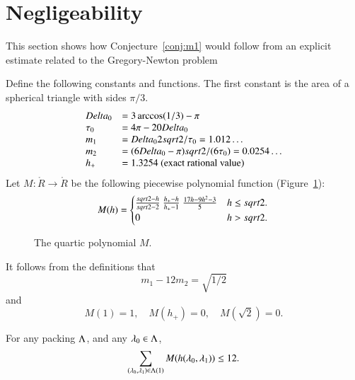 \section{Negligeability}

This section shows how Conjecture~\ref{conj:m1} would follow from an explicit estimate
related to the Gregory-Newton problem


Define the following constants and functions.  The first constant
is the area of a spherical triangle with sides $\pi/3$.
$$
\begin{array}{lll}
\Delta_0 &= 3\arccos(1/3)-\pi\\
\tau_0 &= 4\pi - 20\Delta_0\\
m_1 &= \Delta_0 2\sqrt2/\tau_0 = 1.012\ldots \\ %
m_2  &= (6\Delta_0- \pi)\sqrt2/(6 \tau_0) = 0.0254\ldots\\ %
h_+ &= 1.3254 \hbox{~(exact rational value)}
\end{array}
$$
Let $M:\ring{R}\to\ring{R}$ 
be the following piecewise polynomial function (Figure~\ref{fig:M}):
$$
M(h) =
\begin{cases}
\frac{\sqrt2-h}{\sqrt2-2}~ \frac{h_+-h}{h_+-1} ~\frac{17 h - 9 h^2 - 3}{5} & h \le \sqrt2. \\
 0 & h >\sqrt2.
\end{cases}
\\
$$
\begin{figure}[htb]
  \centering
  \caption{The quartic polynomial $M$.}
  \label{fig:M}
\end{figure}

It follows from the definitions that
\begin{equation}\label{eqn:km}m_1 - 12m_2 = \sqrt{1/2}\end{equation}
and
\begin{equation}M(1) = 1,\quad M(h_+)=0,\quad M(\sqrt2) =0.\end{equation}


\begin{conjecture}[Marchal]\label{conj:m1} For any packing $\Lam$, and
any $\lam_0\in\Lam$, 
$$
\sum_{(\lam_0,\lam_1)\in\Lam(1)} M(h(\lam_0,\lam_1)) \le 12.
$$
\end{conjecture}

